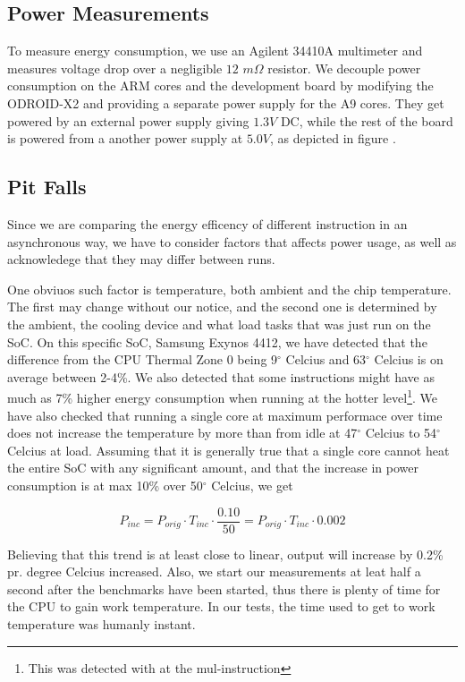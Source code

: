 \subsection{Power Measurements}
To measure energy consumption, we use an Agilent 34410A multimeter and measures
voltage drop over a negligible $12$ $m\Omega$ resistor. We decouple power
consumption on the ARM cores and the development board by modifying the
ODROID-X2 and providing a separate power supply for the A9 cores. They get
powered by an external power supply giving $1.3V$ DC, while the rest of the
board is powered from a another power supply at $5.0V$, as depicted in figure
.

\subsection{Pit Falls}
Since we are comparing the energy efficency of different instruction in an
asynchronous way, we have to consider factors that affects power usage, as well
as acknowledege that they may differ between runs.

One obviuos such factor is temperature, both ambient and the chip temperature.
The first may change without our notice, and the second one is determined by the
ambient, the cooling device and what load tasks that was just run on the SoC. On
this specific SoC, Samsung Exynos 4412, we have detected that the difference
from the CPU Thermal Zone 0 being 9$^\circ$ Celcius and 63$^\circ$ Celcius is on
average between 2-4\%. We also detected that some instructions might have as
much as 7\% higher energy consumption when running at the hotter
level\footnote{This was detected with at the {\ttfamily mul}-instruction}. We
have also checked that running a single core at maximum performace over time
does not increase the temperature by more than from idle at 47$^\circ$ Celcius
to 54$^\circ$ Celcius at load. Assuming that it is generally true that a single
core cannot heat the entire SoC with any significant amount, and that the
increase in power consumption is at max 10\% over 50$^\circ$ Celcius, we get

\begin{equation}
    P_{inc} = P_{orig} \cdot T_{inc} \cdot \frac{0.10}{50} = P_{orig} \cdot T_{inc} \cdot 0.002
\end{equation}

Believing that this trend is at least close to linear, output will increase by
0.2\% pr.  degree Celcius increased. Also, we start our measurements at leat
half a second after the benchmarks have been started, thus there is plenty of
time for the CPU to gain work temperature. In our tests, the time used to get to
work temperature was humanly instant.

